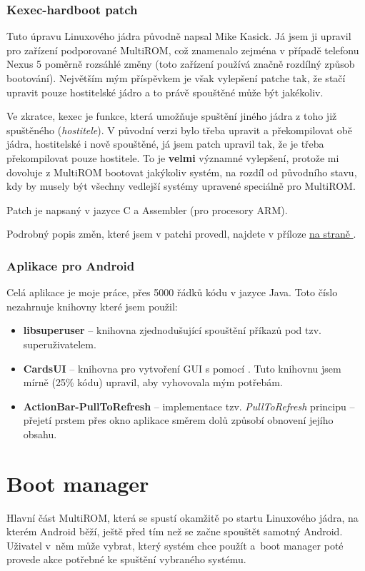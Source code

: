 \documentclass[12pt, a4paper, oneside]{article}
\newcommand{\B}{\textbf} %
\newcommand{\It}{\textit}  %
\newcommand*{\attref}[1]{\hyperref[{#1}]{\uv{\nameref*{#1}} na straně \pageref{#1}}}
\begin{document}
\subsubsection{Kexec-hardboot patch}
Tuto úpravu Linuxového jádra původně napsal Mike Kasick\cite{kexec-hardboot-orig}. Já jsem ji upravil pro zařízení podporované MultiROM, což znamenalo zejména v případě telefonu Nexus 5 poměrně rozsáhlé změny (toto zařízení používá značně rozdílný způsob bootování). Největším mým příspěvkem je však vylepšení patche tak, že stačí upravit pouze hostitelské jádro a to právě spouštěné může být jakékoliv.

Ve zkratce, kexec je funkce, která umožňuje spuštění jiného jádra z toho již spuštěného (\It{hostitele}). V původní verzi bylo třeba upravit a překompilovat obě jádra, hostitelské i nově spouštěné, já jsem patch upravil tak, že je třeba překompilovat pouze hostitele. To je \B{velmi} významné vylepšení, protože mi dovoluje z MultiROM bootovat jakýkoliv systém, na rozdíl od původního stavu, kdy by musely být všechny vedlejší systémy upravené speciálně pro MultiROM.

Patch je napsaný v jazyce C a Assembler (pro procesory ARM).

Podrobný popis změn, které jsem v patchi provedl, najdete v příloze \attref{sec:kexec-hardboot}.

\subsubsection{Aplikace pro Android}
Celá aplikace je moje práce, přes 5000 řádků kódu v jazyce Java. Toto číslo nezahrnuje knihovny které jsem použil:
\begin{itemize}
    \item \B{libsuperuser} -- knihovna zjednodušující spouštění příkazů pod tzv. superuživatelem.
    \item \B{CardsUI} -- knihovna pro vytvoření GUI s pomocí . Tuto knihovnu jsem mírně (25\% kódu) upravil, aby vyhovovala mým potřebám.
    \item \B{ActionBar-PullToRefresh} -- implementace tzv. \It{PullToRefresh} principu -- přejetí prstem přes okno aplikace směrem dolů způsobí obnovení jejího obsahu.
\end{itemize}

\newpage
\section{Boot manager}
Hlavní část MultiROM, která se spustí okamžitě po startu Linuxového jádra, na kterém Android běží, ještě před tím než se začne spouštět samotný Android. Uživatel v~něm může vybrat, který systém chce použít a~boot manager poté provede akce potřebné ke spuštění vybraného systému.
\end{document}
